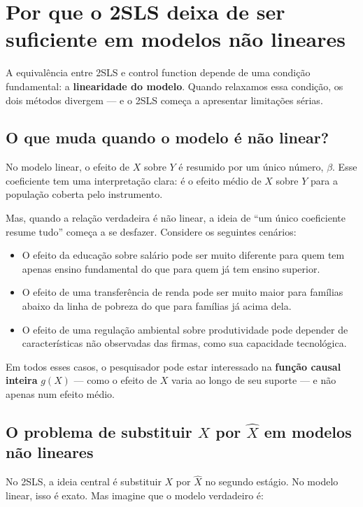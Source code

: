 \chapter{Por que o 2SLS deixa de ser suficiente em modelos não lineares}

A equivalência entre 2SLS e control function depende de uma condição fundamental:
a \textbf{linearidade do modelo}. Quando relaxamos essa condição, os dois métodos
divergem — e o 2SLS começa a apresentar limitações sérias.

\section*{O que muda quando o modelo é não linear?}

No modelo linear, o efeito de $X$ sobre $Y$ é resumido por um único número, $\beta$.
Esse coeficiente tem uma interpretação clara: é o efeito médio de $X$ sobre $Y$ para
a população coberta pelo instrumento.

Mas, quando a relação verdadeira é não linear, a ideia de ``um único coeficiente
resume tudo'' começa a se desfazer. Considere os seguintes cenários:

\begin{itemize}
  \item O efeito da educação sobre salário pode ser muito diferente para quem tem
  apenas ensino fundamental do que para quem já tem ensino superior.
  \item O efeito de uma transferência de renda pode ser muito maior para famílias
  abaixo da linha de pobreza do que para famílias já acima dela.
  \item O efeito de uma regulação ambiental sobre produtividade pode depender de
  características não observadas das firmas, como sua capacidade tecnológica.
\end{itemize}

Em todos esses casos, o pesquisador pode estar interessado na \textbf{função causal
inteira} $g(X)$ — como o efeito de $X$ varia ao longo de seu suporte — e não apenas
num efeito médio.

\section*{O problema de substituir $X$ por $\hat{X}$ em modelos não lineares}

No 2SLS, a ideia central é substituir $X$ por $\hat{X}$ no segundo estágio. No
modelo linear, isso é exato. Mas imagine que o modelo verdadeiro é:

